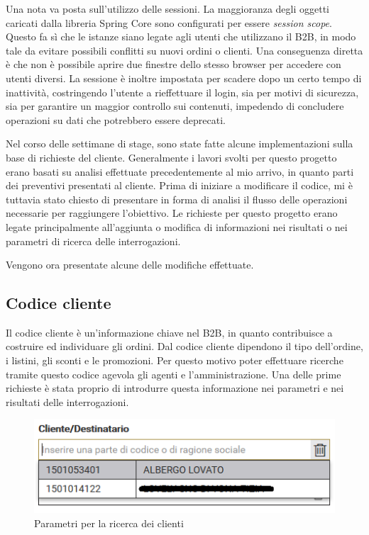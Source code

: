 Una nota va posta sull'utilizzo delle sessioni. La maggioranza degli oggetti caricati dalla libreria Spring Core sono configurati per essere \textit{session scope}. Questo fa sì che le istanze siano legate agli utenti che utilizzano il B2B, in modo tale da evitare possibili conflitti su nuovi ordini o clienti. Una conseguenza diretta è che non è possibile aprire due finestre dello stesso browser per accedere con utenti diversi. La sessione è inoltre impostata per scadere dopo un certo tempo di inattività, costringendo l'utente a rieffettuare il login, sia per motivi di sicurezza, sia per garantire un maggior controllo sui contenuti, impedendo di concludere operazioni su dati che potrebbero essere deprecati.

Nel corso delle settimane di stage, sono state fatte alcune implementazioni sulla base di richieste del cliente. Generalmente i lavori svolti per questo progetto erano basati su analisi effettuate precedentemente al mio arrivo, in quanto parti dei preventivi presentati al cliente. Prima di iniziare a modificare il codice, mi è tuttavia stato chiesto di presentare in forma di analisi il flusso delle operazioni necessarie per raggiungere l'obiettivo. Le richieste per questo progetto erano legate principalmente all'aggiunta o modifica di informazioni nei risultati o nei parametri di ricerca delle interrogazioni.

Vengono ora presentate alcune delle modifiche effettuate.

\subsection{Codice cliente}
Il codice cliente è un'informazione chiave nel B2B, in quanto contribuisce a costruire ed individuare gli ordini. Dal codice cliente dipendono il tipo dell'ordine, i listini, gli sconti e le promozioni. Per questo motivo poter effettuare ricerche tramite questo codice agevola gli agenti e l'amministrazione. Una delle prime richieste è stata proprio di introdurre questa informazione nei parametri e nei risultati delle interrogazioni.
\begin{figure}
	\centering
	\includegraphics{Immagini/p1/clienti-params.png}
	\caption{Parametri per la ricerca dei clienti}
	\label{fig:clienti-params}
\end{figure}

